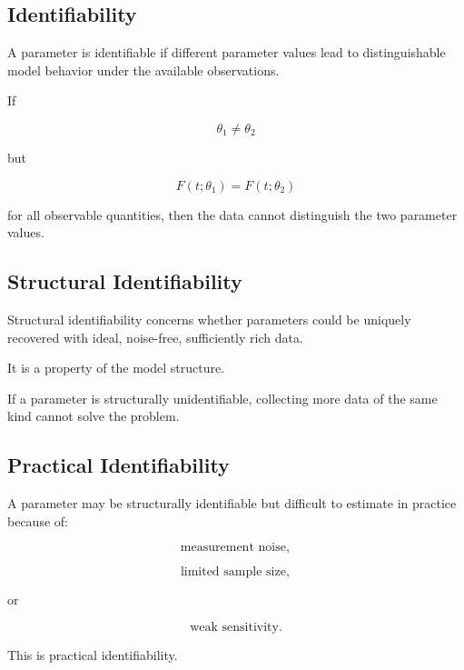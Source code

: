 \subsection{Identifiability}
\label{subsec:model-identifiability}

A parameter is identifiable if different parameter values lead to
distinguishable model behavior under the available observations.

If

\[
\theta_1\neq\theta_2
\]

but

\[
\boxed{
F(t;\theta_1)
=
F(t;\theta_2)
}
\]

for all observable quantities, then the data cannot distinguish the two
parameter values.

\subsection{Structural Identifiability}
\label{subsec:structural-identifiability}

Structural identifiability concerns whether parameters could be uniquely
recovered with ideal, noise-free, sufficiently rich data.

It is a property of the model structure.

If a parameter is structurally unidentifiable, collecting more data of the
same kind cannot solve the problem.

\subsection{Practical Identifiability}
\label{subsec:practical-identifiability}

A parameter may be structurally identifiable but difficult to estimate in
practice because of:

\[
\boxed{
\text{measurement noise},
}
\]

\[
\boxed{
\text{limited sample size},
}
\]

or

\[
\boxed{
\text{weak sensitivity}.
}
\]

This is practical identifiability.

